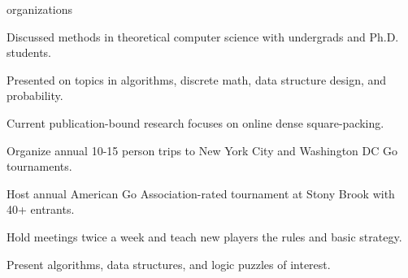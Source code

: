 \documentclass{cv}
\begin{document}
\begin{cvsection}{organizations}
  {
    \item Discussed methods in theoretical computer science with undergrads and Ph.D. students.
    \item Presented on topics in algorithms, discrete math, data structure design, and probability.
    \item Current publication-bound research focuses on online dense square-packing.
  }
  {
    \item Organize annual 10-15 person trips to New York City and Washington DC Go tournaments.
    \item Host annual American Go Association-rated tournament at Stony Brook with 40+ entrants.
    \item Hold meetings twice a week and teach new players the rules and basic strategy.
  }
  {
    \item Present algorithms, data structures, and logic puzzles of interest.
  } 
\end{cvsection}
%
%
\end{document}
